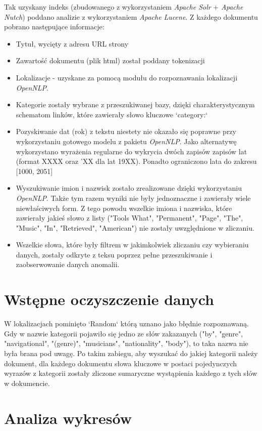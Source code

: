 \documentclass[journal]{article}
\begin{document}
Tak uzyskany indeks (zbudowanego z wykorzystaniem  \textit{Apache Solr} +  \textit{Apache Nutch})
poddano analizie z wykorzystaniem  \textit{Apache Lucene}. Z każdego dokumentu pobrano następujące informacje:
\begin{itemize}
\item Tytuł, wycięty z adresu URL strony
\item Zawartość dokumentu (plik html) został poddany tokenizacji
\item Lokalizacje - uzyskane za pomocą modułu do rozpoznawania lokalizacji \textit{OpenNLP}.
\item Kategorie zostały wybrane z przeszukiwanej bazy, dzięki charakterystycznym schematom linków,
które zawierały słowo kluczowe `category:`
\item Pozyskiwanie dat (rok) z tekstu niestety nie okazało się poprawne przy wykorzystaniu
gotowego modelu z pakietu \textit{OpenNLP}. Jako alternatywę wykorzystano wyrażenia regularne
do wykrycia dwóch zapisów zapisów lat (format XXXX oraz 'XX dla lat 19XX).
Ponadto ograniczono lata do zakresu [1000, 2051]
\item Wyszukiwanie imion i nazwisk zostało zrealizowane dzięki wykorzystaniu \textit{OpenNLP}.
 Także tym razem wyniki nie były jednoznaczne i zawierały wiele niewłaściwych form.
Z tego powodu wszelkie imiona i nazwiska, które zawierały jakieś słowo z listy
("Tools What", "Permanent", "Page", "The", "Music", "In", "Retrieved", "American") nie zostały uwzględnione w zliczaniu.
\item Wszelkie słowa, które były filtrem w jakimkolwiek zliczaniu
czy wybieraniu danych, zostały odkryte z teksu poprzez pełne przeszukiwanie
i zaobserwowanie danych anomalii.
\end{itemize}

\section{Wstępne oczyszczenie danych}
W lokalizacjach pominięto `Random` którą uznano jako błędnie rozpoznawaną.
Gdy w nazwie kategorii pojawiło się jedno ze słów zakazanych
("by", "genre", "navigational", "(genre)", "musicians", "nationality", "body"),
 to taka nazwa nie była brana pod uwagę. Po takim zabiegu, aby wyszukać do jakiej
kategorii należy dokument, dla każdego dokumentu słowa kluczowe w postaci
pojedynczych wyrazów z kategorii zostały zliczone sumaryczne wystąpienia
każdego z tych słów w dokumencie.

\section{Analiza wykresów}
\end{document}
